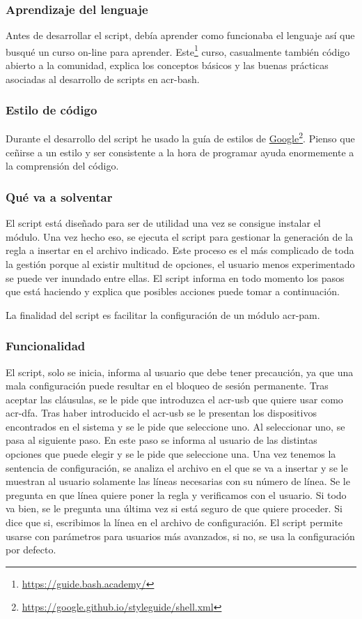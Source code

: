 \documentclass[twoside, titlepage, 12pt, a4paper]{article}
\begin{document}
{\subsubsection{Aprendizaje del lenguaje}
Antes de desarrollar el \gls{script}, debía aprender como funcionaba el lenguaje así que busqué un curso on-line para aprender. 
Este\footnote{\url{https://guide.bash.academy/}} curso, casualmente también código abierto a la comunidad, explica los conceptos básicos y las buenas prácticas asociadas al desarrollo de \gls{script}s en \gls{acr-bash}.\par
\subsubsection{Estilo de código}
Durante el desarrollo del \gls{script} he usado la guía de estilos de \href{https://www.google.com}{Google}\footnote{\url{https://google.github.io/styleguide/shell.xml}}. Pienso que ceñirse a un estilo y ser consistente a la hora de programar ayuda enormemente a la comprensión del código.\par
\subsubsection{Qué va a solventar}
El \gls{script} está diseñado para ser de utilidad una vez se consigue instalar el módulo. Una vez hecho eso, se ejecuta el \gls{script} para gestionar la generación de la regla a insertar en el archivo indicado. Este proceso es el más complicado de toda la gestión porque al existir multitud de opciones, el usuario menos experimentado se puede ver inundado entre ellas. El \gls{script} informa en todo momento los pasos que está haciendo y explica que posibles acciones puede tomar a continuación. \par
La finalidad del \gls{script} es facilitar la configuración de un módulo \gls{acr-pam}.
\subsubsection{Funcionalidad}
El \gls{script}, solo se inicia, informa al usuario que debe tener precaución, ya que una mala configuración puede resultar en el bloqueo de sesión permanente. Tras aceptar las cláusulas, se le pide que introduzca el \gls{acr-usb} que quiere usar como \gls{acr-dfa}. Tras haber introducido el \gls{acr-usb} se le presentan los dispositivos encontrados en el sistema y se le pide que seleccione uno. Al seleccionar uno, se pasa al siguiente paso. En este paso se informa al usuario de las distintas opciones que puede elegir y se le pide que seleccione una. Una vez tenemos la sentencia de configuración, se analiza el archivo en el que se va a insertar y se le muestran al usuario solamente las líneas necesarias con su número de línea. Se le pregunta en que línea quiere poner la regla y verificamos con el usuario. Si todo va bien, se le pregunta una última vez si está seguro de que quiere proceder. Si dice que si, escribimos la línea en el archivo de configuración. El \gls{script} permite usarse con parámetros para usuarios más avanzados, si no, se usa la configuración por defecto.
}
\end{document}
